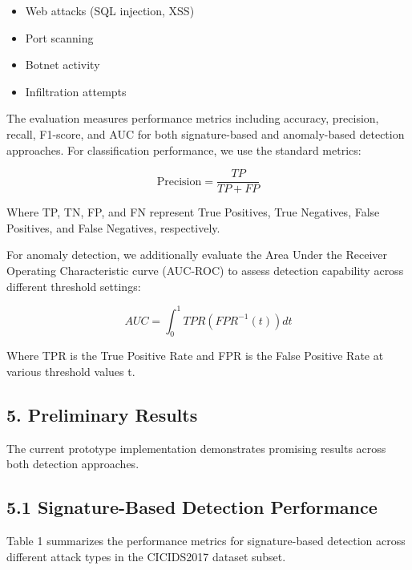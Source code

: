 \documentclass[12pt]{article}
\begin{document}
\begin{itemize}
\item Web attacks (SQL injection, XSS)
\end{itemize}

\begin{itemize}
\item Port scanning
\end{itemize}

\begin{itemize}
\item Botnet activity
\end{itemize}

\begin{itemize}
\item Infiltration attempts
\end{itemize}

The evaluation measures performance metrics including accuracy, precision, recall, F1-score, and AUC for both signature-based and anomaly-based detection approaches. For classification performance, we use the standard metrics:

\begin{equation}
\text{Precision} = \frac{TP}{TP + FP}
\end{equation}

Where TP, TN, FP, and FN represent True Positives, True Negatives, False Positives, and False Negatives, respectively.

For anomaly detection, we additionally evaluate the Area Under the Receiver Operating Characteristic curve (AUC-ROC) to assess detection capability across different threshold settings:

\begin{equation}
AUC = \int_{0}^{1} TPR(FPR^{-1}(t)) dt
\end{equation}

Where TPR is the True Positive Rate and FPR is the False Positive Rate at various threshold values t.

\subsection{5. Preliminary Results}
The current prototype implementation demonstrates promising results across both detection approaches.

\subsection{5.1 Signature-Based Detection Performance}
Table 1 summarizes the performance metrics for signature-based detection across different attack types in the CICIDS2017 dataset subset.
\end{document}
